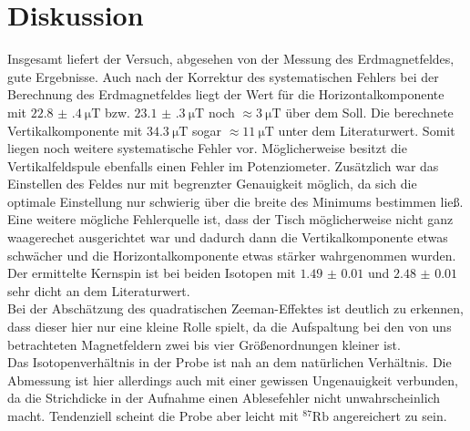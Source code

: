 \documentclass[
  bibliography=totoc,     %
  captions=tableheading,  %
  titlepage=firstiscover, %
]{scrartcl}
\begin{document}
\section{Diskussion}
\label{sec:diskussion}
Insgesamt liefert der Versuch, abgesehen von der Messung des Erdmagnetfeldes, gute
Ergebnisse. Auch nach der Korrektur des systematischen Fehlers bei der Berechnung
des Erdmagnetfeldes liegt der Wert für die Horizontalkomponente mit
$\SI{22.8(4)}{\micro\tesla}$ bzw. $\SI{23.1(3)}{\micro\tesla}$ noch
$\approx \SI{3}{\micro\tesla}$ über dem Soll. Die berechnete Vertikalkomponente
mit $\SI{34.3}{\micro\tesla}$ sogar $\approx \SI{11}{\micro\tesla}$ unter dem
Literaturwert. Somit liegen noch weitere systematische Fehler vor. Möglicherweise
besitzt die Vertikalfeldspule ebenfalls einen Fehler im Potenziometer. Zusätzlich
war das Einstellen des Feldes nur mit begrenzter Genauigkeit möglich, da sich
die optimale Einstellung nur schwierig über die breite des Minimums bestimmen
ließ. Eine weitere mögliche Fehlerquelle ist, dass der Tisch möglicherweise
nicht ganz waagerechet ausgerichtet war und dadurch dann die Vertikalkomponente
etwas schwächer und die Horizontalkomponente etwas stärker wahrgenommen wurden.\\
Der ermittelte Kernspin ist bei beiden Isotopen mit $\num{1.49(1)}$ und $\num{2.48(1)}$
sehr dicht an dem Literaturwert.\\
Bei der Abschätzung des quadratischen Zeeman-Effektes ist deutlich zu erkennen,
dass dieser hier nur eine kleine Rolle spielt, da die Aufspaltung bei den von
uns betrachteten Magnetfeldern zwei bis vier Größenordnungen kleiner ist.\\
Das Isotopenverhältnis in der Probe ist nah an dem natürlichen Verhältnis.
Die Abmessung ist hier allerdings auch mit einer gewissen Ungenauigkeit verbunden,
da die Strichdicke in der Aufnahme einen Ablesefehler nicht unwahrscheinlich macht.
Tendenziell scheint die Probe aber leicht mit $^{87}\mathup{Rb}$ angereichert zu sein.
\newpage
\nocite{*}
\printbibliography
\end{document}

